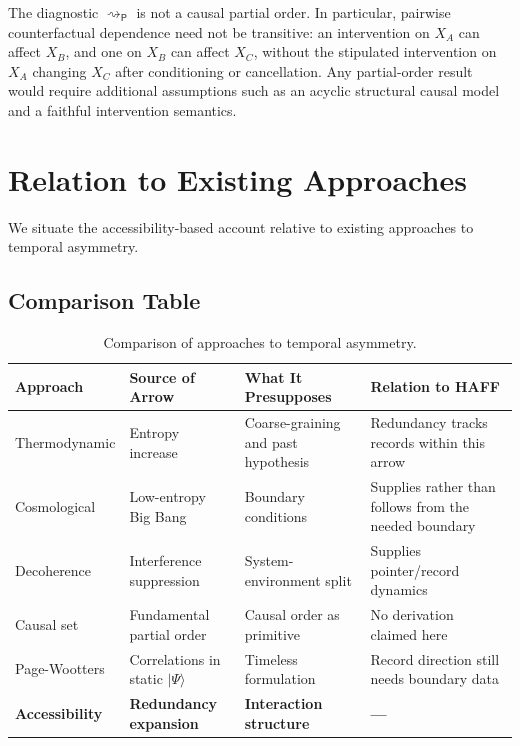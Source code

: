 \documentclass[12pt,a4paper]{article}
\begin{document}
The diagnostic $\rightsquigarrow_{\mathsf P}$ is not a causal partial order.  In particular, pairwise counterfactual dependence need not be transitive: an intervention on $X_A$ can affect $X_B$, and one on $X_B$ can affect $X_C$, without the stipulated intervention on $X_A$ changing $X_C$ after conditioning or cancellation.  Any partial-order result would require additional assumptions such as an acyclic structural causal model and a faithful intervention semantics.

\section{Relation to Existing Approaches}
\label{sec:relations}

We situate the accessibility-based account relative to existing approaches to temporal asymmetry.

\subsection{Comparison Table}

\begin{table}[ht]
\centering
\small
\begin{tabular}{|P{2.8cm}|P{3.5cm}|P{3.5cm}|P{3cm}|}
\hline
\textbf{Approach} & \textbf{Source of Arrow} & \textbf{What It Presupposes} & \textbf{Relation to HAFF} \\
\hline
Thermodynamic & Entropy increase & Coarse-graining and past hypothesis & Redundancy tracks records within this arrow \\
\hline
Cosmological & Low-entropy Big Bang & Boundary conditions & Supplies rather than follows from the needed boundary \\
\hline
Decoherence & Interference suppression & System-environment split & Supplies pointer/record dynamics \\
\hline
Causal set & Fundamental partial order & Causal order as primitive & No derivation claimed here \\
\hline
Page-Wootters & Correlations in static $|\Psi\rangle$ & Timeless formulation & Record direction still needs boundary data \\
\hline
\textbf{Accessibility} & \textbf{Redundancy expansion} & \textbf{Interaction structure} & \textbf{---} \\
\hline
\end{tabular}
\caption{Comparison of approaches to temporal asymmetry.}
\label{tab:comparison}
\end{table}
\end{document}
